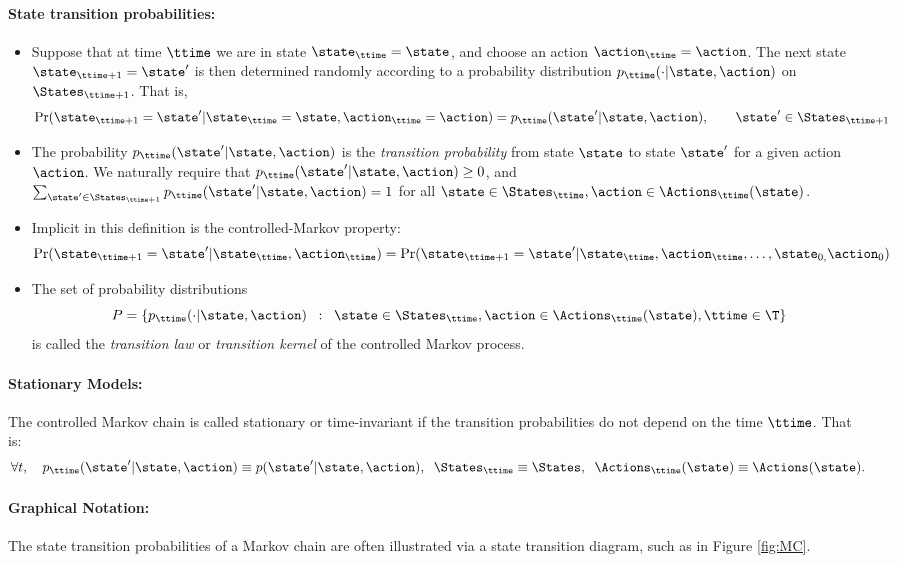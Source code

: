 \paragraph{State transition probabilities:}
\begin{itemize}
\item   Suppose that at time $\ttime$ we are in state ${\state_\ttime} = \state$, and choose an action ${\action_\ttime} = \action$. The next state ${\state_{\ttime + 1}} = \state'$ is then determined randomly according to a probability distribution  ${p_\ttime}( \cdot |\state,\action)$ on ${\States_{\ttime + 1}}$. That is,
\[\Pr({\state_{\ttime + 1}} = \state'|{\state_\ttime} = \state,{\action_\ttime} = \action) = {p_\ttime}(\state'|\state,\action),\quad      \quad \state' \in {\States_{\ttime + 1}}\]
\item   The probability ${p_\ttime}(\state'|\state,\action)$ is the \emph{transition probability} from state $\state$ to state $\state'$ for a given action $\action$. We naturally require that
            ${p_\ttime}(\state'|\state,\action) \ge 0$, and $\sum\nolimits_{\state' \in {\States_{\ttime + 1}}}^{} {{p_\ttime}(\state'|\state,\action)}  = 1$ for all $\state \in {\States_\ttime},\action \in {\Actions_\ttime}(\state)$.
\item   Implicit in this definition is the controlled-Markov property:
\[\Pr({\state_{\ttime + 1}} = \state'|{\state_\ttime},{\action_\ttime}) = \Pr({\state_{\ttime + 1}} = \state'|{\state_\ttime},{\action_\ttime}, \ldots ,{\state_{0,}}{\action_0})\]
\item   The set of probability distributions
                                \[P = \{ {p_\ttime}( \cdot |\state,\action)\;\;:\;\;\state \in {\States_\ttime},\action \in {\Actions_\ttime}(\state),\ttime \in {\T}\} \]
is called the \emph{transition law} or \emph{transition kernel} of the controlled Markov process.
\end{itemize}

\paragraph{Stationary Models:}
    The controlled Markov chain is called stationary or time-invariant if the transition probabilities do not depend on the time $\ttime$. That is:
                     \[\forall t,\quad {p_\ttime}(\state'|\state,\action) \equiv p(\state'|\state,\action),\;\;{\States_\ttime} \equiv \States,\;\;{\Actions_\ttime}(\state) \equiv \Actions(\state).\]

\paragraph{Graphical Notation:}
The state transition probabilities of a Markov chain are often illustrated via a state transition diagram, such as in Figure \ref{fig:MC}.

